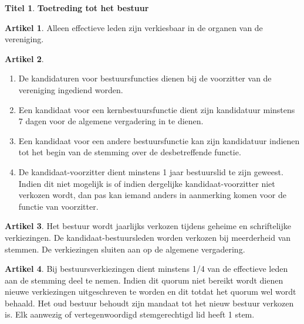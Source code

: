 \documentclass[a4paper,10pt]{article}
\theoremstyle{definition}
\newtheorem{titel}{\newline\Large Titel}
\newtheorem{artikelbase}{\large Artikel}
\newenvironment{artikel}
  {\begin{artikelbase}}
  {\smallskip
   \end{artikelbase}}
\newcommand{\ttext}[1]{\Large \textbf{#1} \normalsize}
\newcommand{\ttextcr}{\hfill\newline}
\newcommand{\ttextenum}{\mbox{}}
\begin{document}
\begin{titel}\ttext{Toetreding tot het bestuur}

  \begin{artikel}\ttextcr
    Alleen effectieve leden zijn verkiesbaar in de organen van de vereniging.
  \end{artikel}

  \begin{artikel}\ttextenum
    \begin{enumerate}
      \item
        De kandidaturen voor bestuursfuncties dienen bij de voorzitter van de vereniging ingediend worden.
      \item
        Een kandidaat voor een kernbestuursfunctie dient zijn kandidatuur minstens 7 dagen voor de algemene vergadering in te dienen.
      \item
        Een kandidaat voor een andere bestuursfunctie kan zijn kandidatuur indienen tot het begin van de stemming over de desbetreffende functie.
      \item
        De kandidaat-voorzitter dient minstens 1 jaar bestuurslid te zijn geweest.
        Indien dit niet mogelijk is of indien dergelijke kandidaat-voorzitter niet verkozen wordt, dan pas kan iemand anders in aanmerking komen voor de functie van voorzitter.
    \end{enumerate}
  \end{artikel}

  \begin{artikel}\ttextcr
    Het bestuur wordt jaarlijks verkozen tijdens geheime en schriftelijke verkiezingen.
    De kandidaat-bestuursleden worden verkozen bij meerderheid van stemmen.
    De verkiezingen sluiten aan op de algemene vergadering.
  \end{artikel}

  \begin{artikel}\ttextcr
    Bij bestuursverkiezingen dient minstens 1/4 van de effectieve leden aan de stemming deel te nemen.
    Indien dit quorum niet bereikt wordt dienen nieuwe verkiezingen uitgeschreven te worden en dit totdat het quorum wel wordt behaald.
    Het oud bestuur behoudt zijn mandaat tot het nieuw bestuur verkozen is.
    Elk aanwezig of vertegenwoordigd stemgerechtigd lid heeft 1 stem.
  \end{artikel}


\end{titel}
\end{document}
